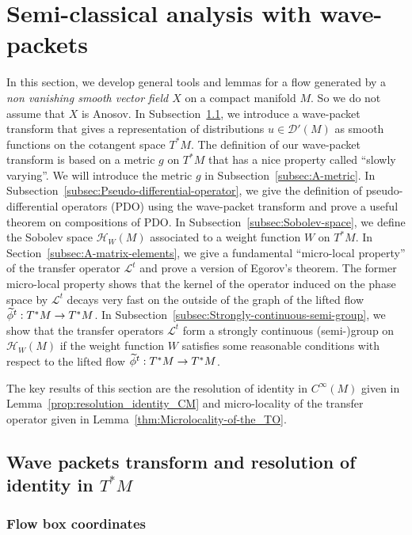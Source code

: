 \documentclass[10pt]{amsart}
\theoremstyle{definition}\newtheorem{defi}[theo]{Definition}\newtheorem{rema}[theo]{Remark}\newtheorem{exam}[theo]{Example}\newtheorem{exem}[theo]{Example}\newtheorem{nota}[theo]{Notation}
\newcommand{\clH}{\mathcal{H}}
\newcommand{\clL}{\mathcal{L}}
\newcommand{\clD}{\mathcal{D}}
\let\oldtilde\tilde
\renewcommand*{\tilde}[1]{\mathchoice{\widetilde{#1}}{\widetilde{#1}}{\oldtilde{#1}}{\oldtilde{#1}}}
\begin{document}
\section{Semi-classical analysis with wave-packets}\label{sec:Semiclassical-analysis-with}

In this section, we develop general tools and lemmas for a flow generated by a \emph{non vanishing smooth vector field $X$ }on a compact manifold $M$. So we do not assume that $X$ is Anosov. In Subsection~\ref{subsec:Resolution-of-identity}, we introduce a wave-packet transform that gives a representation of distributions $u\in\clD'(M)$ as smooth functions on the cotangent space $T^{*}M$. The definition of our wave-packet transform is based on a metric $g$ on $T^{*}M$ that has a nice property called ``slowly varying''. We will introduce the metric $g$ in Subsection~\ref{subsec:A-metric}. In Subsection~\ref{subsec:Pseudo-differential-operator}, we give the definition of pseudo-differential operators (PDO) using the wave-packet transform and prove a useful theorem on compositions of PDO. In Subsection~\ref{subsec:Sobolev-space}, we define the Sobolev space $\clH _{W}(M)$ associated to a weight function $W$ on $T^{*}M$. In Section~\ref{subsec:A-matrix-elements}, we give a fundamental ``micro-local property'' of the transfer operator $\clL^{t}$ and prove a version of Egorov's theorem. The former micro-local property shows that the kernel of the operator induced on the phase space by $\clL^{t}$ decays very fast on the outside of the graph of the lifted flow $\tilde{\phi}^{t}:T^{*}M\rightarrow T^{*}M$. In Subsection~\ref{subsec:Strongly-continuous-semi-group}, we show that the transfer operators $\clL^{t}$ form a strongly continuous (semi-)group on $\clH _{W}(M)$ if the weight function $W$ satisfies some reasonable conditions with respect to the lifted flow $\tilde{\phi}^{t}:T^{*}M\rightarrow T^{*}M$.

The key results of this section are the resolution of identity in $C^{\infty}(M)$ given in Lemma~\ref{prop:resolution_identity_CM} and micro-locality of the transfer operator given in Lemma~\ref{thm:Microlocality-of-the_TO}.

\subsection{Wave packets transform and resolution of identity in \texorpdfstring{$T^{*}M$}{T*M}}\label{subsec:Resolution-of-identity}

\subsubsection{Flow box coordinates}
\end{document}

